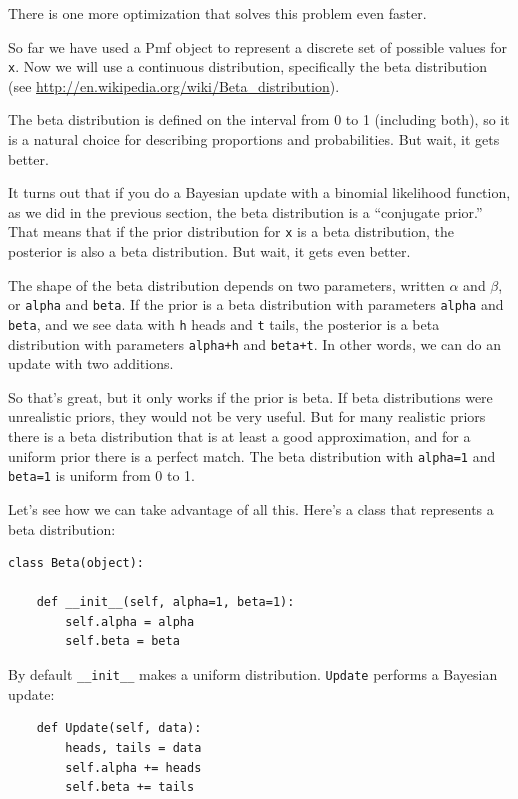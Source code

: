 \documentclass[12pt]{book}
\begin{document}
There is one more optimization that solves this problem
even faster.

So far we have used a Pmf object to represent a discrete set of
possible values for {\tt x}.  Now we will use a continuous
distribution, specifically the beta distribution (see
\url{http://en.wikipedia.org/wiki/Beta_distribution}).

The beta distribution is defined on the interval from 0 to 1
(including both), so it is a natural choice for describing
proportions and probabilities.  But wait, it gets better.

It turns out that if you do a Bayesian update with a binomial
likelihood function, as we did in the previous section, the beta
distribution is a ``conjugate prior.''  That means that if the prior
distribution for {\tt x} is a beta distribution, the posterior is also
a beta distribution.  But wait, it gets even better.

The shape of the beta distribution depends on two parameters, written
$\alpha$ and $\beta$, or {\tt alpha} and {\tt beta}.  If the prior
is a beta distribution with parameters {\tt alpha} and {\tt beta}, and
we see data with {\tt h} heads and {\tt t} tails, the posterior is a
beta distribution with parameters {\tt alpha+h} and {\tt beta+t}.  In
other words, we can do an update with two additions.

So that's great, but it only works if the prior is beta.  If beta
distributions were unrealistic priors, they would not be very useful.
But for many realistic priors there is a beta distribution that is at
least a good approximation, and for a uniform prior there is a perfect
match.  The beta distribution with {\tt alpha=1} and {\tt beta=1} is
uniform from 0 to 1.

Let's see how we can take advantage of all this.  Here's
a class that represents a beta distribution:

\begin{verbatim}
class Beta(object):

    def __init__(self, alpha=1, beta=1):
        self.alpha = alpha
        self.beta = beta
\end{verbatim}

By default \verb"__init__" makes a uniform distribution.
{\tt Update} performs a Bayesian update:

\begin{verbatim}
    def Update(self, data):
        heads, tails = data
        self.alpha += heads
        self.beta += tails
\end{verbatim}
\end{document}
